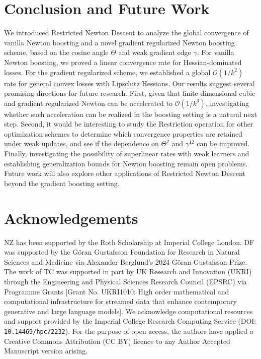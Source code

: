\documentclass{article}
\theoremstyle{plain}
\theoremstyle{definition}
\theoremstyle{remark}
\begin{document}
\section{Conclusion and Future Work}

We introduced Restricted Newton Descent to analyze the global convergence of vanilla Newton boosting and a novel gradient regularized Newton boosting scheme, based on the cosine angle $\Theta$ and weak gradient edge $\gamma$. For vanilla Newton boosting, we proved a linear convergence rate for Hessian-dominated losses. For the gradient regularized scheme, we established a global $\mathcal{O}(1/k^2)$ rate for general convex losses with Lipschitz Hessians. Our results suggest several promising directions for future research. First, given that finite-dimensional cubic and gradient regularized Newton can be accelerated to $\mathcal{O}(1/k^3)$, investigating whether such acceleration can be realized in the boosting setting is a natural next step. Second, it would be interesting to study the Restriction operation for other optimization schemes to determine which convergence properties are retained under weak updates, and see if the dependence on $\Theta^2$ and $\gamma^{12}$ can be improved. Finally, investigating the possibility of superlinear rates with weak learners and establishing generalization bounds for Newton boosting remain open problems. Future work will also explore other applications of Restricted Newton Descent beyond the gradient boosting setting.











\section*{Acknowledgements}
NZ has been supported by the Roth Scholarship at Imperial College London. DF was supported by the Göran Gustafsson Foundation for Research in Natural Sciences and Medicine via Alexander Berglund's 2024 Göran Gustafsson Prize. The work of TC was supported in part by UK Research and Innovation (UKRI) through the Engineering and Physical Sciences Research Council (EPSRC) via Programme Grants [Grant No. UKRI1010: High order mathematical and computational infrastructure for streamed data that enhance contemporary generative and large language models]. We acknowledge computational resources and support provided by the Imperial College Research Computing Service (DOI: \texttt{10.14469/hpc/2232}). For the purpose of open access, the authors have applied a Creative Commons Attribution (CC BY) licence to any Author Accepted Manuscript version arising.
\end{document}
